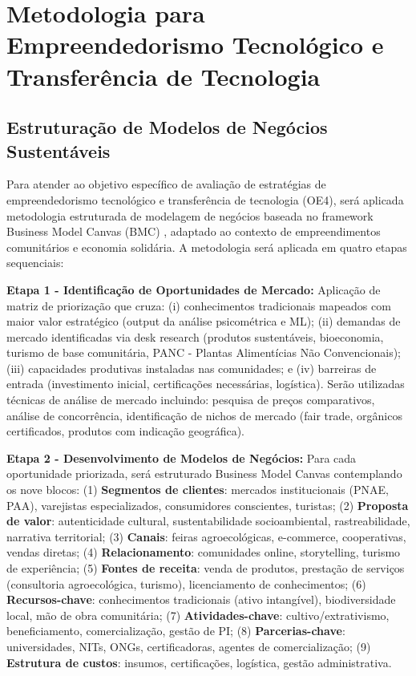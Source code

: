 \section{Metodologia para Empreendedorismo Tecnológico e Transferência de Tecnologia}

\subsection{Estruturação de Modelos de Negócios Sustentáveis}

Para atender ao objetivo específico de avaliação de estratégias de empreendedorismo tecnológico e transferência de tecnologia (OE4), será aplicada metodologia estruturada de modelagem de negócios baseada no framework Business Model Canvas (BMC) \cite{Tidd2005}, adaptado ao contexto de empreendimentos comunitários e economia solidária. A metodologia será aplicada em quatro etapas sequenciais:

\textbf{Etapa 1 - Identificação de Oportunidades de Mercado:} Aplicação de matriz de priorização que cruza: (i) conhecimentos tradicionais mapeados com maior valor estratégico (output da análise psicométrica e ML); (ii) demandas de mercado identificadas via desk research (produtos sustentáveis, bioeconomia, turismo de base comunitária, PANC - Plantas Alimentícias Não Convencionais); (iii) capacidades produtivas instaladas nas comunidades; e (iv) barreiras de entrada (investimento inicial, certificações necessárias, logística). Serão utilizadas técnicas de análise de mercado incluindo: pesquisa de preços comparativos, análise de concorrência, identificação de nichos de mercado (fair trade, orgânicos certificados, produtos com indicação geográfica).

\textbf{Etapa 2 - Desenvolvimento de Modelos de Negócios:} Para cada oportunidade priorizada, será estruturado Business Model Canvas contemplando os nove blocos: (1) \textbf{Segmentos de clientes}: mercados institucionais (PNAE, PAA), varejistas especializados, consumidores conscientes, turistas; (2) \textbf{Proposta de valor}: autenticidade cultural, sustentabilidade socioambiental, rastreabilidade, narrativa territorial; (3) \textbf{Canais}: feiras agroecológicas, e-commerce, cooperativas, vendas diretas; (4) \textbf{Relacionamento}: comunidades online, storytelling, turismo de experiência; (5) \textbf{Fontes de receita}: venda de produtos, prestação de serviços (consultoria agroecológica, turismo), licenciamento de conhecimentos; (6) \textbf{Recursos-chave}: conhecimentos tradicionais (ativo intangível), biodiversidade local, mão de obra comunitária; (7) \textbf{Atividades-chave}: cultivo/extrativismo, beneficiamento, comercialização, gestão de PI; (8) \textbf{Parcerias-chave}: universidades, NITs, ONGs, certificadoras, agentes de comercialização; (9) \textbf{Estrutura de custos}: insumos, certificações, logística, gestão administrativa.

